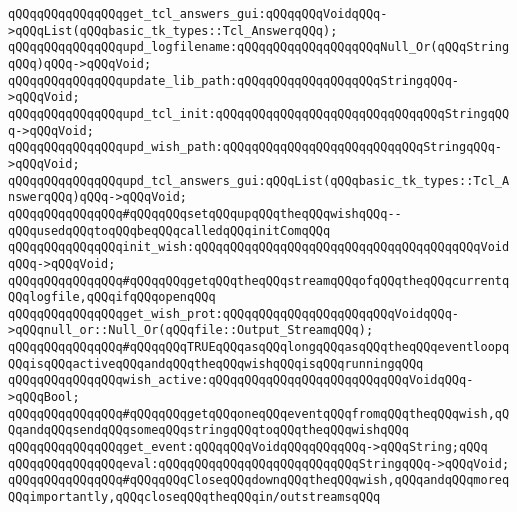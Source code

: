 \verb|qQQqqQQqqQQqqQQqget_tcl_answers_gui:qQQqqQQqVoidqQQq->qQQqList(qQQqbasic_tk_types::Tcl_AnswerqQQq);|\newline
\newline
\verb|qQQqqQQqqQQqqQQqupd_logfilename:qQQqqQQqqQQqqQQqqQQqNull_Or(qQQqStringqQQq)qQQq->qQQqVoid;|\newline
\verb|qQQqqQQqqQQqqQQqupdate_lib_path:qQQqqQQqqQQqqQQqqQQqStringqQQq->qQQqVoid;|\newline
\verb|qQQqqQQqqQQqqQQqupd_tcl_init:qQQqqQQqqQQqqQQqqQQqqQQqqQQqqQQqStringqQQq->qQQqVoid;|\newline
\verb|qQQqqQQqqQQqqQQqupd_wish_path:qQQqqQQqqQQqqQQqqQQqqQQqqQQqStringqQQq->qQQqVoid;|\newline
\verb|qQQqqQQqqQQqqQQqupd_tcl_answers_gui:qQQqList(qQQqbasic_tk_types::Tcl_AnswerqQQq)qQQq->qQQqVoid;|\newline
\newline
\verb|qQQqqQQqqQQqqQQq#qQQqqQQqsetqQQqupqQQqtheqQQqwishqQQq--qQQqusedqQQqtoqQQqbeqQQqcalledqQQqinitComqQQq|\newline
\verb|qQQqqQQqqQQqqQQqinit_wish:qQQqqQQqqQQqqQQqqQQqqQQqqQQqqQQqqQQqqQQqVoidqQQq->qQQqVoid;|\newline
\newline
\verb|qQQqqQQqqQQqqQQq#qQQqqQQqgetqQQqtheqQQqstreamqQQqofqQQqtheqQQqcurrentqQQqlogfile,qQQqifqQQqopenqQQq|\newline
\verb|qQQqqQQqqQQqqQQqget_wish_prot:qQQqqQQqqQQqqQQqqQQqqQQqVoidqQQq->qQQqnull_or::Null_Or(qQQqfile::Output_StreamqQQq);|\newline
\newline
\verb|qQQqqQQqqQQqqQQq#qQQqqQQqTRUEqQQqasqQQqlongqQQqasqQQqtheqQQqeventloopqQQqisqQQqactiveqQQqandqQQqtheqQQqwishqQQqisqQQqrunningqQQq|\newline
\verb|qQQqqQQqqQQqqQQqwish_active:qQQqqQQqqQQqqQQqqQQqqQQqqQQqVoidqQQq->qQQqBool;|\newline
\newline
\verb|qQQqqQQqqQQqqQQq#qQQqqQQqgetqQQqoneqQQqeventqQQqfromqQQqtheqQQqwish,qQQqandqQQqsendqQQqsomeqQQqstringqQQqtoqQQqtheqQQqwishqQQq|\newline
\verb|qQQqqQQqqQQqqQQqget_event:qQQqqQQqVoidqQQqqQQqqQQq->qQQqString;qQQq|\newline
\verb|qQQqqQQqqQQqqQQqeval:qQQqqQQqqQQqqQQqqQQqqQQqqQQqStringqQQq->qQQqVoid;|\newline
\newline
\verb|qQQqqQQqqQQqqQQq#qQQqqQQqCloseqQQqdownqQQqtheqQQqwish,qQQqandqQQqmoreqQQqimportantly,qQQqcloseqQQqtheqQQqin/outstreamsqQQq|\newline
